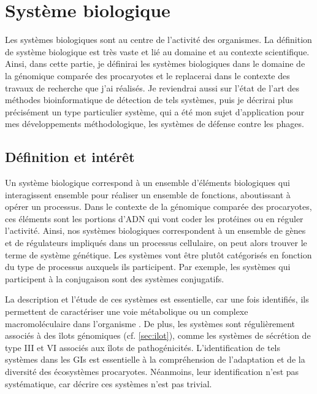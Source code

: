 \section{Système biologique}
\label{sec:sys_bio}

Les systèmes biologiques sont au centre de l'activité des organismes. La définition de système biologique est très vaste et lié au domaine et au contexte scientifique. Ainsi, dans cette partie, je définirai les systèmes biologiques dans le domaine de la génomique comparée des procaryotes et le replacerai dans le contexte des travaux de recherche que j'ai réalisés. Je reviendrai aussi sur l'état de l'art des méthodes bioinformatique de détection de tels systèmes, puis je décrirai plus précisément un type particulier système, qui a été mon sujet d'application pour mes développements méthodologique, les systèmes de défense contre les phages.

\subsection{Définition et intérêt}

Un système biologique correspond à un ensemble d'éléments biologiques qui interagissent ensemble pour réaliser un ensemble de fonctions, aboutissant à opérer un processus. Dans le contexte de la génomique comparée des procaryotes, ces éléments sont les portions d'ADN qui vont coder  les protéines ou en réguler l'activité.
Ainsi, nos systèmes biologiques correspondent à un ensemble de gènes et de régulateurs impliqués dans un processus cellulaire, on peut alors trouver le terme de système génétique. Les systèmes vont être plutôt catégorisés en fonction du type de processus auxquels ils participent. Par exemple, les systèmes qui participent à la conjugaison sont des systèmes conjugatifs.

La description et l'étude de ces systèmes est essentielle, car une fois identifiés, ils permettent de caractériser une voie métabolique ou un complexe macromoléculaire dans l'organisme \cite{alberts_cell_1998}. De plus, les systèmes sont régulièrement associés à des îlots génomiques (cf. \autoref{sec:ilot}), comme les systèmes de sécrétion de type III et VI associés aux îlots de pathogénicités\cite{pallen_bacterial_2007}. L'identification de tels systèmes dans les GIs est essentielle à la compréhension de l'adaptation et de la diversité des écosystèmes procaryotes. Néanmoins, leur identification n'est pas systématique, car décrire ces systèmes n'est pas trivial.

